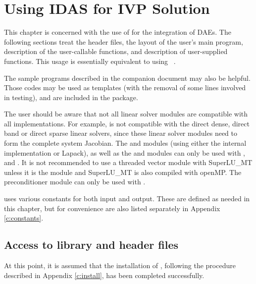 \chapter{Using IDAS for IVP Solution}\label{s:simulation}

This chapter is concerned with the use of {\idas} for the integration
of DAEs.  The following sections treat the header files,
the layout of the user's main program, description of the {\idas} user-callable
functions, and description of user-supplied functions.
This usage is essentially equivalent to using {\ida}~\cite{ida_ug}.

The sample programs described in the companion document \cite{idas_ex} 
may also be helpful. Those codes may be used as templates (with the removal of
some lines involved in testing), and are included in the {\idas} package.

The user should be aware that not all linear solver modules are compatible 
with all {\nvector} implementations. 
For example, {\nvecp} is not compatible with the direct dense, direct
band or direct sparse linear solvers, since these linear solver
modules need to form the complete system Jacobian.  The {\idadense}
and {\idaband} modules (using either the internal implementation or
Lapack), as well as the {\idaklu} and {\idasuperlumt} modules can only
be used with {\nvecs}, {\nvecopenmp} and {\nvecpthreads}. 
It is not recommended to use a threaded vector module with SuperLU\_MT
unless it is the {\nvecopenmp} module and SuperLU\_MT is also compiled
with openMP.
The preconditioner module {\idabbdpre} can only be used with {\nvecp}. 

{\idas} uses various constants for both input and output.  These are
defined as needed in this chapter, but for convenience are also listed
separately in Appendix \ref{c:constants}.

\section{Access to library and header files}\label{ss:file_access}

At this point, it is assumed that the installation of {\idas},
following the procedure described in Appendix \ref{c:install}, has
been completed successfully.

